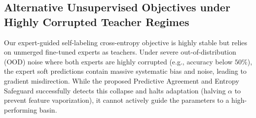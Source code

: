 \documentclass{article}
\theoremstyle{plain}
\theoremstyle{definition}
\theoremstyle{remark}
\begin{document}
\subsection{Alternative Unsupervised Objectives under Highly Corrupted Teacher Regimes}
Our expert-guided self-labeling cross-entropy objective is highly stable but relies on unmerged fine-tuned experts as teachers. Under severe out-of-distribution (OOD) noise where both experts are highly corrupted (e.g., accuracy below $50\%$), the expert soft predictions contain massive systematic bias and noise, leading to gradient misdirection. While the proposed Predictive Agreement and Entropy Safeguard successfully detects this collapse and halts adaptation (halving $\alpha$ to prevent feature vaporization), it cannot actively guide the parameters to a high-performing basin.
\end{document}
